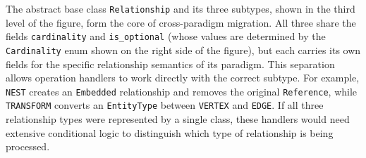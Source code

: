   The abstract base class \texttt{Relationship} and its three subtypes, shown in the third level of the figure, form the core of cross-paradigm migration. All three
  share the fields \texttt{cardinality} and \texttt{is\_optional} (whose values are determined by the \texttt{Cardinality} enum shown on the right side of the figure),
  but each carries its own fields for the specific relationship semantics of its paradigm. This separation allows operation handlers to work directly with the correct
  subtype. For example, \texttt{NEST} creates an \texttt{Embedded} relationship and removes the original \texttt{Reference}, while \texttt{TRANSFORM} converts an
  \texttt{EntityType} between \texttt{VERTEX} and \texttt{EDGE}. If all three relationship types were represented by a single class, these handlers would need extensive
  conditional logic to distinguish which type of relationship is being processed.

